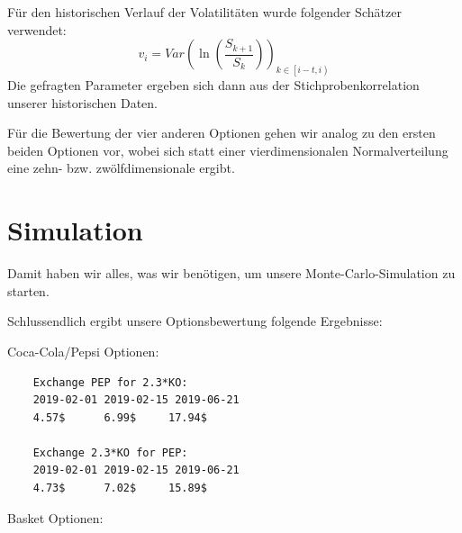 \documentclass[12pt]{article}
\begin{document}
	Für den historischen Verlauf der Volatilitäten wurde folgender Schätzer verwendet:
	\begin{equation*}
	v_i=Var\left(\ln\left(\frac{S_{k+1}}{S_k}\right)\right)_{k\in\left[i-t,i\right)}
	\end{equation*}
	Die gefragten Parameter ergeben sich dann aus der Stichprobenkorrelation unserer historischen Daten.
	
	Für die Bewertung der vier anderen Optionen gehen wir analog zu den ersten beiden Optionen vor, wobei sich statt einer vierdimensionalen Normalverteilung eine zehn- bzw. zwölfdimensionale ergibt.
	
	
	
	\section*{Simulation}
	
	Damit haben wir alles, was wir benötigen, um unsere Monte-Carlo-Simulation zu starten.
	
	
	
	Schlussendlich ergibt unsere Optionsbewertung folgende Ergebnisse:
	
	Coca-Cola/Pepsi Optionen:
	
	\begin{verbatim}
	Exchange PEP for 2.3*KO:
	2019-02-01 2019-02-15 2019-06-21
	4.57$      6.99$     17.94$ 
	
	Exchange 2.3*KO for PEP:
	2019-02-01 2019-02-15 2019-06-21
	4.73$      7.02$     15.89$
	\end{verbatim}
	
	
	Basket Optionen:
	
\end{document}
